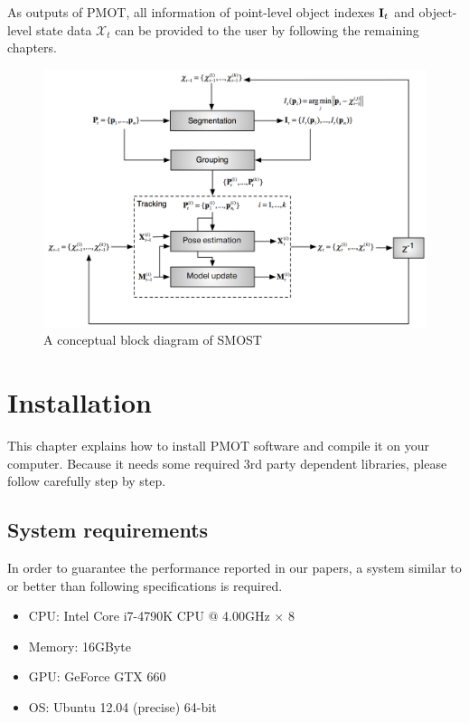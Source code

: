 \documentclass[a4paper,twoside, openright,12pt]{report}
\begin{document}
As outputs of PMOT, all information of point-level object indexes ${\bf{I}}_t$ and object-level state data ${\mathcal{X}}_{t}$ can be provided to the user by following the remaining chapters.
 
\begin{figure}[t]
	\centering
	\includegraphics[width=\linewidth]{fig/smost_framework.png}
	\caption{A conceptual block diagram of SMOST}
	\label{fig:concept}
\end{figure}

\chapter{Installation}

This chapter explains how to install PMOT software and compile it on your computer. Because it needs some required 3rd party dependent libraries, please follow carefully step by step.

\section{System requirements}
 
In order to guarantee the performance reported in our papers, a system similar to or better than following specifications is required. 

\begin{itemize} 
	\item CPU: Intel Core i7-4790K CPU @ 4.00GHz $\times$ 8
	\item Memory: 16GByte
	\item GPU: GeForce GTX 660
	\item OS: Ubuntu 12.04 (precise) 64-bit	
	
\end{itemize} 
\end{document}
